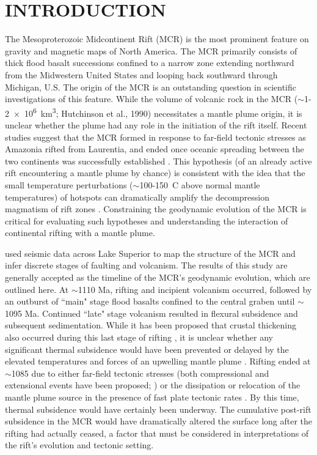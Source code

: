 \documentclass[12pt,letterpaper]{article}
\begin{document}
\section*{INTRODUCTION}
The Mesoproterozoic Midcontinent Rift (MCR) is the most prominent feature on gravity and magnetic maps of North America. The MCR primarily consists of thick flood basalt successions confined to a narrow zone extending northward from the Midwestern United States and looping back southward through Michigan, U.S. The origin of the MCR is an outstanding question in scientific investigations of this feature. While the volume of volcanic rock in the MCR ($\sim$1-\SI{2e6}{km^3}; Hutchinson et al., 1990\nocite{Hutchinson1990a}) necessitates a mantle plume origin, it is unclear whether the plume had any role in the initiation of the rift itself. Recent studies suggest that the MCR formed in response to far-field tectonic stresses as Amazonia rifted from Laurentia, and ended once oceanic spreading between the two continents was successfully established \cite{Stein2014a}. This hypothesis (of an already active rift encountering a mantle plume by chance) is consistent with the idea that the small temperature perturbations ($\sim$100-150\textdegree\ C above normal mantle temperatures) of hotspots can dramatically amplify the decompression magmatism of rift zones \citep{White1989a}. Constraining the geodynamic evolution of the MCR is critical for evaluating such hypotheses and understanding the interaction of continental rifting with a mantle plume.\par

\cite{Cannon1992a} used seismic data across Lake Superior to map the structure of the MCR and infer discrete stages of faulting and volcanism. The results of this study are generally accepted as the timeline of the MCR's geodynamic evolution, which are outlined here. At $\sim$1110 Ma, rifting and incipient volcanism occurred, followed by an outburst of ``main" stage flood basalts confined to the central graben until $\sim$1095 Ma. Continued ``late" stage volcanism resulted in flexural subsidence and subsequent sedimentation. While it has been proposed that crustal thickening also occurred during this last stage of rifting \citep{Stein2015a}, it is unclear whether any significant thermal subsidence would have been prevented or delayed by the elevated temperatures and forces of an upwelling mantle plume \citep{White1997a}. Rifting ended at $\sim$1085 due to either far-field tectonic stresses (both compressional and extensional events have been proposed; \cite{Stein2014a,Cannon1994a}) or the dissipation or relocation of the mantle plume source in the presence of fast plate tectonic rates \citep{Swanson-Hysell2014a}. By this time, thermal subsidence would have certainly been underway. The cumulative post-rift subsidence in the MCR would have dramatically altered the surface long after the rifting had actually ceased, a factor that must be considered in interpretations of the rift's evolution and tectonic setting.\par
\end{document}
